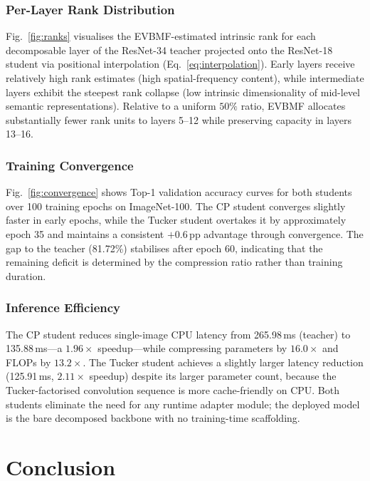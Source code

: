 \documentclass[conference]{IEEEtran}
\begin{document}
\subsubsection{Per-Layer Rank Distribution}
Fig.~\ref{fig:ranks} visualises the EVBMF-estimated intrinsic rank for each
decomposable layer of the ResNet-34 teacher projected onto the ResNet-18
student via positional interpolation (Eq.~\ref{eq:interpolation}).
Early layers receive relatively high rank estimates (high spatial-frequency
content), while intermediate layers exhibit the steepest rank collapse
(low intrinsic dimensionality of mid-level semantic representations).
Relative to a uniform $50\%$ ratio, EVBMF allocates substantially fewer
rank units to layers 5--12 while preserving capacity in layers 13--16.

\subsubsection{Training Convergence}
Fig.~\ref{fig:convergence} shows Top-1 validation accuracy curves for both
students over 100 training epochs on ImageNet-100. The CP student converges
slightly faster in early epochs, while the Tucker student overtakes it by
approximately epoch 35 and maintains a consistent $+0.6$\,pp advantage
through convergence. The gap to the teacher (81.72\%) stabilises after
epoch 60, indicating that the remaining deficit is determined by the
compression ratio rather than training duration.

\subsubsection{Inference Efficiency}
The CP student reduces single-image CPU latency from 265.98\,ms (teacher)
to 135.88\,ms—a $1.96\times$ speedup—while compressing parameters by
$16.0\times$ and FLOPs by $13.2\times$. The Tucker student achieves a
slightly larger latency reduction (125.91\,ms, $2.11\times$ speedup) despite
its larger parameter count, because the Tucker-factorised convolution sequence
is more cache-friendly on CPU. Both students eliminate the need for any
runtime adapter module; the deployed model is the bare decomposed backbone
with no training-time scaffolding.












\section{Conclusion}
\label{sec:conclusion}
\end{document}
